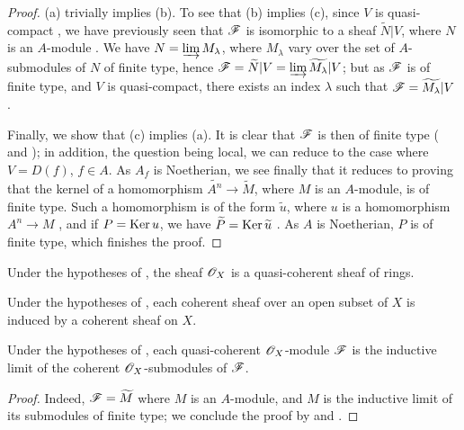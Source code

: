 \begin{proof}
\label{proof-1.1.5.1}
(a) trivially implies (b). To see that (b) implies (c), since $V$ is quasi-compact
, we have previously seen that $\mathscr{F}$ is isomorphic to a
sheaf $\widetilde{N}|V$, where $N$ is an $A$-module . We have
$N=\varinjlim M_\lambda$, where $M_\lambda$ vary over the set of $A$-submodules of $N$ of finite type, hence
 $\mathscr{F}=\widetilde{N}|V=\varinjlim\widetilde{M_\lambda}|V$; but as $\mathscr{F}$
is of finite type, and $V$ is quasi-compact, there exists an index $\lambda$ such that
$\mathscr{F}=\widetilde{M_\lambda}|V$ .

Finally, we show that (c) implies (a). It is clear that $\mathscr{F}$ is then of finite type
( and ); in addition, the question being local, we can
reduce to the case where $V=D(f)$, $f\in A$. As $A_f$ is Noetherian, we see finally that it
reduces to proving that the kernel of a homomorphism $\widetilde{A^n}\to\widetilde{M}$, where
$M$ is an $A$-module, is of finite type. Such a homomorphism is of the form $\widetilde{u}$,
where $u$ is a homomorphism $A^n\to M$ , and if $P={\mathop{\mathrm{Ker}}\nolimits}\, u$, we have
$\widetilde{P}={\mathop{\mathrm{Ker}}\nolimits}\,\widetilde{u}$ . As $A$ is Noetherian, $P$ is of finite
type, which finishes the proof.
\end{proof}

\begin{cor}[1.5.2]
\label{1.1.5.2}
Under the hypotheses of , the sheaf $\mathscr{O}_X$ is a quasi-coherent sheaf of
rings.
\end{cor}

\begin{cor}[1.5.3]
\label{1.1.5.3}
Under the hypotheses of , each coherent sheaf over an open subset of $X$ is
induced by a coherent sheaf on $X$.
\end{cor}

\begin{cor}[1.5.4]
\label{1.1.5.4}
Under the hypotheses of , each quasi-coherent $\mathscr{O}_X$-module $\mathscr{F}$ is
the inductive limit of the coherent $\mathscr{O}_X$-submodules of $\mathscr{F}$.
\end{cor}

\begin{proof}
\label{proof-1.1.5.4}
Indeed, $\mathscr{F}=\widetilde{M}$ where $M$ is an $A$-module, and $M$ is the inductive limit of
its submodules of finite type; we conclude the proof by  and
.
\end{proof}


